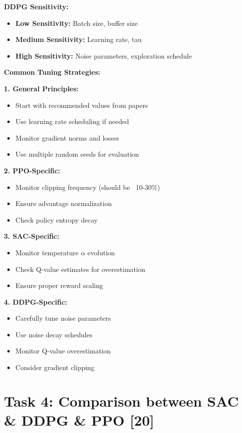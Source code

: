 \documentclass[12pt]{article}
\begin{document}
{{{\textbf{DDPG Sensitivity:}
\begin{itemize}
    \item \textbf{Low Sensitivity:} Batch size, buffer size
    \item \textbf{Medium Sensitivity:} Learning rate, tau
    \item \textbf{High Sensitivity:} Noise parameters, exploration schedule
\end{itemize}

\textbf{Common Tuning Strategies:}

\textbf{1. General Principles:}
\begin{itemize}
    \item Start with recommended values from papers
    \item Use learning rate scheduling if needed
    \item Monitor gradient norms and losses
    \item Use multiple random seeds for evaluation
\end{itemize}

\textbf{2. PPO-Specific:}
\begin{itemize}
    \item Monitor clipping frequency (should be ~10-30\%)
    \item Ensure advantage normalization
    \item Check policy entropy decay
\end{itemize}

\textbf{3. SAC-Specific:}
\begin{itemize}
    \item Monitor temperature $\alpha$ evolution
    \item Check Q-value estimates for overestimation
    \item Ensure proper reward scaling
\end{itemize}

\textbf{4. DDPG-Specific:}
\begin{itemize}
    \item Carefully tune noise parameters
    \item Use noise decay schedules
    \item Monitor Q-value overestimation
    \item Consider gradient clipping
\end{itemize}


\newpage

\section{Task 4: Comparison between SAC \& DDPG \& PPO [20]}

}}}
\end{document}
